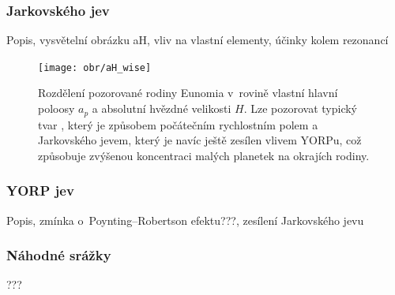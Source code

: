 \documentclass[A4paper, 12pt, oneside]{book}%
\begin{document}
\subsubsection{Jarkovského jev} \label{sec:jarko}
Popis, vysvětelní obrázku aH, vliv na vlastní elementy, účinky kolem rezonancí
\begin{figure}[!htb]
	\centering
	\texttt{[image: obr/aH\_wise]}
	\caption{Rozdělení pozorované rodiny Eunomia v~rovině vlastní hlavní poloosy $a_p$ a absolutní hvězdné velikosti $H$. Lze pozorovat typický tvar , který je způsobem počátečním rychlostním polem a Jarkovského jevem, který je navíc ještě zesílen vlivem YORPu, což způsobuje zvýšenou koncentraci malých planetek na okrajích rodiny.}
	\label{aH_wise}
\end{figure}
\subsubsection{YORP jev}
Popis, zmínka o~Poynting–Robertson efektu???, zesílení Jarkovského jevu
\subsubsection{Náhodné srážky}
???
\end{document}
